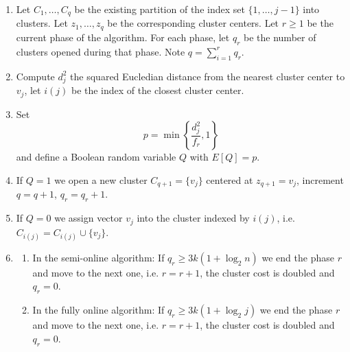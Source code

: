 \documentclass{article}
\begin{document}
\begin{enumerate}
\item Let $C_1,\dots, C_q$ be the existing partition of the index set $\{1,\dots,j-1\}$ into clusters. Let $z_1,\dots,z_q$ be the corresponding cluster centers. Let $r\ge 1$ be the current phase of the algorithm. For each phase, let $q_r$ be the number of clusters opened during that phase. Note $q=\sum_{i=1}^rq_r$.
\item Compute $d^2_j$ the squared Eucledian distance from the nearest cluster center to $v_j$, let $i(j)$ be the index of  the closest cluster center. 
\item  Set
$$p=\min \left\{\frac{d^2_j}{f_r},1\right\}$$ and define a Boolean random variable $Q$ with $E[Q]=p$.
\item If $Q=1$ we  open a new cluster $C_{q+1}=\{v_j\}$ centered at $z_{q+1}=v_j$, increment $q=q+1$, $q_r=q_r+1$.  
\item If $Q=0$ we assign vector $v_j$ into the cluster indexed by $i(j)$, i.e. $C_{i(j)}=C_{i(j)}\cup \{v_j\}$.
\item 
\begin{enumerate}
\item In the semi-online algorithm: If $q_r\ge 3 k (1+ \log_2 n)$  we end the phase $r$ and move to the next one, i.e. $r=r+1$, the cluster cost is doubled and $q_{r}=0$.
\item In the fully online algorithm: If $q_r\ge 3 k(1+  \log_2 j)$  we end the phase $r$ and move to the next one, i.e. $r=r+1$, the cluster cost is doubled and $q_{r}=0$.
\end{enumerate}
\end{enumerate}
\end{document}
